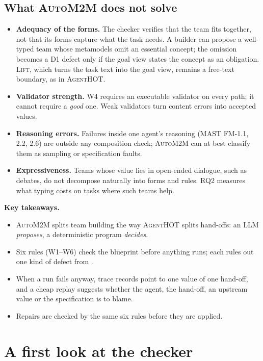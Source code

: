 \documentclass[10pt,a4paper]{article}
\newcommand{\tool}{\textsc{AgentHOT}}
\newcommand{\auto}{\textsc{AutoM2M}}
\newcommand{\W}[1]{\textsf{W#1}}
\newcommand{\D}[1]{\textsf{D#1}}
\newenvironment{takeaway}{%
  \begin{tcolorbox}[enhanced, colback=keybg, colframe=keybg, arc=0pt, boxrule=0pt,
     borderline west={2.2pt}{0pt}{keybar}, left=8pt, right=8pt, top=5pt, bottom=5pt,
     before skip=8pt, after skip=8pt]
  \textsf{\bfseries\color{keybar}Key takeaways.}\par\smallskip}{\end{tcolorbox}}
\begin{document}
\subsection{What \auto{} does not solve}\label{sec:limits-design}

\begin{itemize}
\item \textbf{Adequacy of the forms.} The checker verifies that the team
fits together, not that its forms capture what the task needs. A builder
can propose a well-typed team whose metamodels omit an essential concept;
the omission becomes a \D{1} defect only if the goal view states the
concept as an obligation. \textsc{Lift}, which turns the task text into the
goal view, remains a free-text boundary, as in \tool{}.
\item \textbf{Validator strength.} \W{4} requires an executable validator on
every path; it cannot require a \emph{good} one. Weak validators turn
content errors into accepted values.
\item \textbf{Reasoning errors.} Failures inside one agent's reasoning (MAST
FM-1.1, 2.2, 2.6) are outside any composition check; \auto{} can at best
classify them as sampling or specification faults.
\item \textbf{Expressiveness.} Teams whose value lies in open-ended dialogue,
such as debates, do not decompose naturally into forms and rules. RQ2
measures what typing costs on tasks where such teams help.
\end{itemize}

\begin{takeaway}
\begin{itemize}
\item \auto{} splits team building the way \tool{} splits hand-offs: an LLM
\emph{proposes}, a deterministic program \emph{decides}.
\item Six rules (\W{1}--\W{6}) check the blueprint before anything runs; each
rules out one kind of defect from .
\item When a run fails anyway, trace records point to one value of one
hand-off, and a cheap replay suggests whether the agent, the hand-off, an
upstream value or the specification is to blame.
\item Repairs are checked by the same six rules before they are applied.
\end{itemize}
\end{takeaway}
\section{A first look at the checker}\label{sec:checkerstudy}
\end{document}
